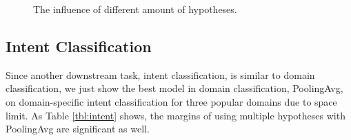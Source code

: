 \begin{figure}[h]
	\centering


	\caption{The influence of different amount of hypotheses.}

	\label{fig:amount}
	
\end{figure}

\subsection{Intent Classification}
\begin{table}[!htp]

	\label{tbl:intent}
	\centering

\end{table}
Since another downstream task, intent classification, is similar to domain classification, we just show the best model in domain classification, PoolingAvg, on 
domain-specific
intent classification for three popular domains due to space limit. As Table \ref{tbl:intent} shows, the margins of using multiple hypotheses with PoolingAvg are significant as well.

